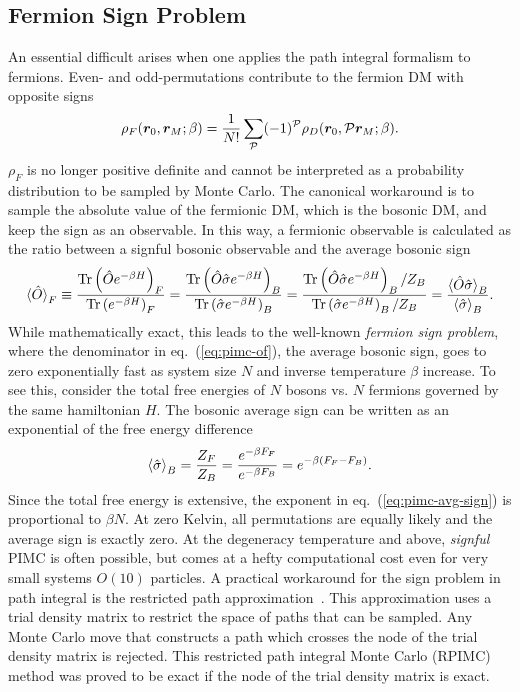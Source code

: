 \subsection{Fermion Sign Problem} \label{sec:fermion-sign-problem}
An essential difficult arises when one applies the path integral formalism to fermions. Even- and odd-permutations contribute to the fermion DM with opposite signs
\begin{align}
\rho_F(\boldsymbol{r}_0,\boldsymbol{r}_M;\beta) = \frac{1}{N!}\sum\limits_{\mathcal{P}} (-1)^{\mathcal{P}} \rho_D(\boldsymbol{r}_0, \mathcal{P}\boldsymbol{r}_M;\beta).
\end{align}
$\rho_F$ is no longer positive definite and cannot be interpreted as a probability distribution to be sampled by Monte Carlo. The canonical workaround is to sample the absolute value of the fermionic DM, which is the bosonic DM, and keep the sign as an observable. In this way, a fermionic observable is calculated as the ratio between a signful bosonic observable and the average bosonic sign
\begin{align} \label{eq:pimc-of}
\braket{\hat{O}}_F \equiv \dfrac{\text{Tr}\left(\hat{O}e^{-\beta H}\right)_F}{\text{Tr}\left(e^{-\beta H}\right)_F}=
\dfrac{\text{Tr}\left(\hat{O}\hat{\sigma}e^{-\beta H}\right)_B}{\text{Tr}\left(\hat{\sigma} e^{-\beta H}\right)_B}=
\dfrac{\text{Tr}\left(\hat{O}\hat{\sigma}e^{-\beta H}\right)_B/Z_B}{\text{Tr}\left(\hat{\sigma} e^{-\beta H}\right)_B/Z_B}=\dfrac{\braket{\hat{O}\hat{\sigma}}_B}{ \braket{\hat{\sigma}}_B }.
\end{align}
While mathematically exact, this leads to the well-known \emph{fermion sign problem}, where the denominator in eq.~(\ref{eq:pimc-of}), the average bosonic sign, goes to zero exponentially fast as system size $N$ and inverse temperature $\beta$ increase.
To see this, consider the total free energies of $N$ bosons vs. $N$ fermions governed by the same hamiltonian $H$. The bosonic average sign can be written as an exponential of the free energy difference
\begin{align} \label{eq:pimc-avg-sign}
\braket{\hat{\sigma}}_B = \dfrac{Z_F}{Z_B} = \dfrac{e^{-\beta F_F}}{e^{-\beta F_B}} = e^{-\beta (F_F-F_B)}.
\end{align}
Since the total free energy is extensive, the exponent in eq.~(\ref{eq:pimc-avg-sign}) is proportional to $\beta N$.
At zero Kelvin, all permutations are equally likely and the average sign is exactly zero.
At the degeneracy temperature and above, \textit{signful} PIMC is often possible, but comes at a hefty computational cost even for very small systems $O(10)$ particles.
A practical workaround for the sign problem in path integral is the restricted path approximation~\cite{Ceperley1991,Ceperley1992,Ceperley1996}.
This approximation uses a trial density matrix to restrict the space of paths that can be sampled.
Any Monte Carlo move that constructs a path which crosses the node of the trial density matrix is rejected.
This restricted path integral Monte Carlo (RPIMC) method was proved to be exact if the node of the trial density matrix is exact.

